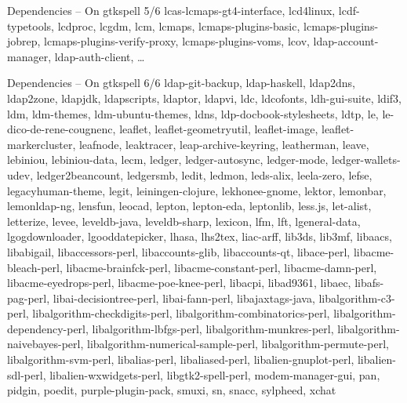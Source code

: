 \documentclass{beamer}
\begin{document}
\begin{frame}{Dependencies – On gtkspell 5/6}
lcas-lcmaps-gt4-interface, lcd4linux, lcdf-typetools, lcdproc, lcgdm, lcm, lcmaps, lcmaps-plugins-basic, lcmaps-plugins-jobrep, lcmaps-plugins-verify-proxy, lcmaps-plugins-voms, lcov, ldap-account-manager, ldap-auth-client, …
\end{frame}

\begin{frame}{Dependencies – On gtkspell 6/6}
\tiny ldap-git-backup, ldap-haskell, ldap2dns, ldap2zone, ldapjdk, ldapscripts, ldaptor, ldapvi, ldc, ldcofonts, ldh-gui-suite, ldif3, ldm, ldm-themes, ldm-ubuntu-themes, ldns, ldp-docbook-stylesheets, ldtp, le, le-dico-de-rene-cougnenc, leaflet, leaflet-geometryutil, leaflet-image, leaflet-markercluster, leafnode, leaktracer, leap-archive-keyring, leatherman, leave, lebiniou, lebiniou-data, lecm, ledger, ledger-autosync, ledger-mode, ledger-wallets-udev, ledger2beancount, ledgersmb, ledit, ledmon, leds-alix, leela-zero, lefse, legacyhuman-theme, legit, leiningen-clojure, lekhonee-gnome, lektor, lemonbar, lemonldap-ng, lensfun, leocad, lepton, lepton-eda, leptonlib, less.js, let-alist, letterize, levee, leveldb-java, leveldb-sharp, lexicon, lfm, lft, lgeneral-data, lgogdownloader, lgooddatepicker, lhasa, lhs2tex, liac-arff, lib3ds, lib3mf, libaacs, libabigail, libaccessors-perl, libaccounts-glib, libaccounts-qt, libace-perl, libacme-bleach-perl, libacme-brainfck-perl, libacme-constant-perl, libacme-damn-perl, libacme-eyedrops-perl, libacme-poe-knee-perl, libacpi, libad9361, libaec, libafs-pag-perl, libai-decisiontree-perl, libai-fann-perl, libajaxtags-java, libalgorithm-c3-perl, libalgorithm-checkdigits-perl, libalgorithm-combinatorics-perl, libalgorithm-dependency-perl, libalgorithm-lbfgs-perl, libalgorithm-munkres-perl, libalgorithm-naivebayes-perl, libalgorithm-numerical-sample-perl, libalgorithm-permute-perl, libalgorithm-svm-perl, libalias-perl, libaliased-perl, libalien-gnuplot-perl, libalien-sdl-perl, libalien-wxwidgets-perl, \alert{libgtk2-spell-perl}, modem-manager-gui, pan, pidgin, poedit, purple-plugin-pack, smuxi, sn, snacc, sylpheed, xchat
\end{frame}
\end{document}
